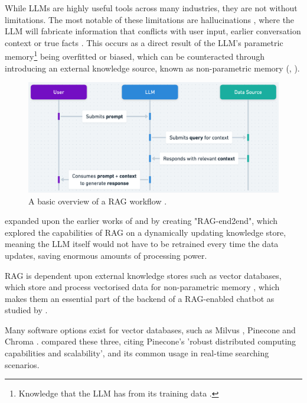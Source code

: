 \documentclass[12pt]{report}
\begin{document}
    While LLMs are highly useful tools across many industries, they are not without limitations. The most notable 
    of these limitations are hallucinations \autocite{lewis_retrieval-augmented_2021}, where the LLM will fabricate 
    information that conflicts with user input, earlier conversation context or true facts \autocite{zhang_sirens_2023}. This occurs as a direct result of the LLM's parametric memory\footnote{Knowledge that the LLM has from its training data \autocite{siriwardhana_improving_2023}.}
    being overfitted or biased, which can be counteracted through introducing an external knowledge source, known as non-parametric memory (\textcite{komeili_internet-augmented_2022}, \textcite{siriwardhana_improving_2023}).
    
    \begin{figure}[H] 
        \centering
        \includegraphics[width=.8\linewidth]{RAGProcess.png}
        \caption{A basic overview of a RAG workflow \autocite{openai_retrieval_nodate}.}
        \label{fig:RAGProcess}
    \end{figure}

    \textcite{siriwardhana_improving_2023} expanded upon the earlier works of \textcite{karpukhin_dense_2020} and \textcite{lewis_pre-training_2020} by creating 
    "RAG-end2end", which explored the capabilities of RAG on a dynamically updating knowledge store, meaning the LLM itself would not have to be retrained 
    every time the data updates, saving enormous amounts of processing power.
    
    RAG is dependent upon external knowledge stores such as vector databases, which store and process vectorised data
    for non-parametric memory \autocite{li_modernization_2023}, which makes them an essential part of the backend of 
    a RAG-enabled chatbot as studied by \textcite{odede_jaybot_2024}. 
    
    Many software options exist for
    vector databases, such as Milvus \autocite{wang_milvus_2021}, Pinecone \autocite{pinecone_pinecone_nodate} and Chroma \autocite{chroma_chroma_nodate}.
    \textcite{xie_brief_2023} compared these three, citing Pinecone's 'robust distributed computing capabilities and scalability', and its common usage 
    in real-time searching scenarios.
    
\end{document}
